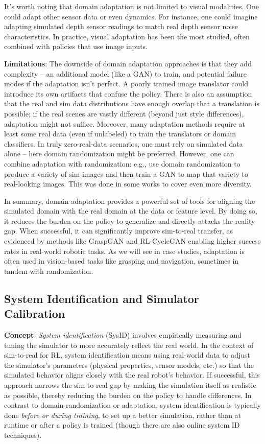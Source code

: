 It’s worth noting that domain adaptation is not limited to visual modalities. One could adapt other sensor data or even dynamics. For instance, one could imagine adapting simulated depth sensor readings to match real depth sensor noise characteristics. In practice, visual adaptation has been the most studied, often combined with policies that use image inputs.

\textbf{Limitations}: The downside of domain adaptation approaches is that they add complexity – an additional model (like a GAN) to train, and potential failure modes if the adaptation isn’t perfect. A poorly trained image translator could introduce its own artifacts that confuse the policy. There is also an assumption that the real and sim data distributions have enough overlap that a translation is possible; if the real scenes are vastly different (beyond just style differences), adaptation might not suffice. Moreover, many adaptation methods require at least some real data (even if unlabeled) to train the translators or domain classifiers. In truly zero-real-data scenarios, one must rely on simulated data alone – here domain randomization might be preferred. However, one can combine adaptation with randomization: e.g., use domain randomization to produce a variety of sim images and then train a GAN to map that variety to real-looking images. This was done in some works to cover even more diversity.

In summary, domain adaptation provides a powerful set of tools for aligning the simulated domain with the real domain at the data or feature level. By doing so, it reduces the burden on the policy to generalize and directly attacks the reality gap. When successful, it can significantly improve sim-to-real transfer, as evidenced by methods like GraspGAN and RL-CycleGAN enabling higher success rates in real-world robotic tasks. As we will see in case studies, adaptation is often used in vision-based tasks like grasping and navigation, sometimes in tandem with randomization.

\subsection{System Identification and Simulator Calibration}
\textbf{Concept}: \textit{System identification} (SysID) involves empirically measuring and tuning the simulator to more accurately reflect the real world. In the context of sim-to-real for RL, system identification means using real-world data to adjust the simulator’s parameters (physical properties, sensor models, etc.) so that the simulated behavior aligns closely with the real robot’s behavior. If successful, this approach narrows the sim-to-real gap by making the simulation itself as realistic as possible, thereby reducing the burden on the policy to handle differences. In contrast to domain randomization or adaptation, system identification is typically done \textit{before or during training}, to set up a better simulation, rather than at runtime or after a policy is trained (though there are also online system ID techniques).

